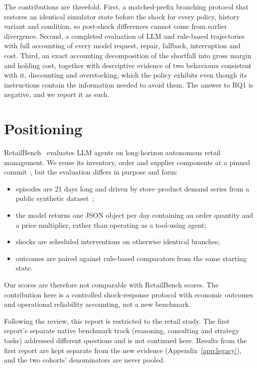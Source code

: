 \documentclass[runningheads]{llncs}
\begin{document}
The contributions are threefold. First, a matched-prefix branching protocol that restores an identical simulator state before the shock for every policy, history variant and condition, so post-shock differences cannot come from earlier divergence. Second, a completed evaluation of  LLM and  rule-based trajectories with full accounting of every model request, repair, fallback, interruption and cost. Third, an exact accounting decomposition of the shortfall into gross margin and holding cost, together with descriptive evidence of two behaviours consistent with it, discounting and overstocking, which the policy exhibits even though its instructions contain the information needed to avoid them. The answer to RQ1 is negative, and we report it as such.

\section{Positioning}\label{sec:positioning}

RetailBench~\cite{retailbench2026} evaluates LLM agents on long-horizon autonomous retail management. We reuse its inventory, order and supplier components at a pinned commit~\cite{retailbench_code}, but the evaluation differs in purpose and form:
\begin{itemize}
\item episodes are 21 days long and driven by store--product demand series from a public synthetic dataset~\cite{kaggle_retail_v8};
\item the model returns one JSON object per day containing an order quantity and a price multiplier, rather than operating as a tool-using agent;
\item shocks are scheduled interventions on otherwise identical branches;
\item outcomes are paired against rule-based comparators from the same starting state.
\end{itemize}
Our scores are therefore not comparable with RetailBench scores. The contribution here is a controlled shock-response protocol with economic outcomes and operational reliability accounting, not a new benchmark.

Following the review, this report is restricted to the retail study. The first report's separate native benchmark track (reasoning, consulting and strategy tasks) addressed different questions and is not continued here. Results from the first report are kept separate from the new evidence (Appendix~\ref{app:legacy}), and the two cohorts' denominators are never pooled.
\end{document}
